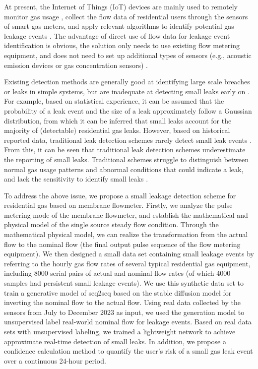 \documentclass[10pt, sigconf]{acmart}
\begin{document}
At present, the Internet of Things (IoT) devices are mainly used to remotely monitor gas usage \cite{suma2019gas}, collect the flow data of residential users through the sensors of smart gas meters, and apply relevant algorithms to identify potential gas leakage events \cite{ali2022solution, li2023accurate}. The advantage of direct use of flow data for leakage event identification is obvious, the solution only needs to use existing flow metering equipment, and does not need to set up additional types of sensors (e.g., acoustic emission devices or gas concentration sensors) \cite{zaman2020review}.

Existing detection methods are generally good at identifying large scale breaches or leaks in simple systems, but are inadequate at detecting small leaks early on \cite{ge2008analysis, tian2016study, rahmat2017water}. For example, based on statistical experience, it can be assumed that the probability of a leak event and the size of a leak approximately follow a Gaussian distribution, from which it can be inferred that small leaks account for the majority of (detectable) residential gas leaks. However, based on historical reported data, traditional leak detection schemes rarely detect small leak events \cite{dange2024automated}. From this, it can be seen that traditional leak detection schemes underestimate the reporting of small leaks. Traditional schemes struggle to distinguish between normal gas usage patterns and abnormal conditions that could indicate a leak, and lack the sensitivity to identify small leaks \cite{salhi2019early, sekhavati2022computational, khan2020sensor}.

To address the above issue, we propose a small leakage detection scheme for residential gas based on membrane flowmeter. Firstly, we analyze the pulse metering mode of the membrane flowmeter, and establish the mathematical and physical model of the single source steady flow condition. Through the mathematical physical model, we can realize the transformation from the actual flow to the nominal flow (the final output pulse sequence of the flow metering equipment). We then designed a small data set containing small leakage events by referring to the hourly gas flow rates of several typical residential gas equipment, including 8000 serial pairs of actual and nominal flow rates (of which 4000 samples had persistent small leakage events). We use this synthetic data set to train a generative model of seq2seq based on the stable diffusion model for inverting the nominal flow to the actual flow. Using real data collected by the sensors from July to December 2023 as input, we used the generation model to unsupervised label real-world nominal flow for leakage events. Based on real data sets with unsupervised labeling, we trained a lightweight network to achieve approximate real-time detection of small leaks. In addition, we propose a confidence calculation method to quantify the user's risk of a small gas leak event over a continuous 24-hour period.
\end{document}
